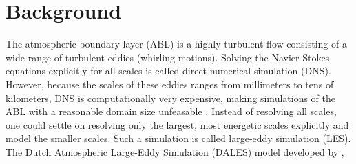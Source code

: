 \section{Background}
The atmospheric boundary layer (ABL) is a highly turbulent flow consisting of a wide range of turbulent eddies (whirling motions). Solving the Navier-Stokes equations explicitly for all scales is called direct numerical simulation (DNS). However, because the scales of these eddies ranges from millimeters to tens of kilometers, DNS is computationally very expensive, making simulations of the ABL with a reasonable domain size unfeasable \citep{moengNUMERICALMODELSLargeEddy2015}. Instead of resolving all scales, one could settle on resolving only the largest, most energetic scales explicitly and model the smaller scales. Such a simulation is called large-eddy simulation (LES). The Dutch Atmospheric Large-Eddy Simulation (DALES) model developed by \citet{heusFormulationDutchAtmospheric2010}, 


